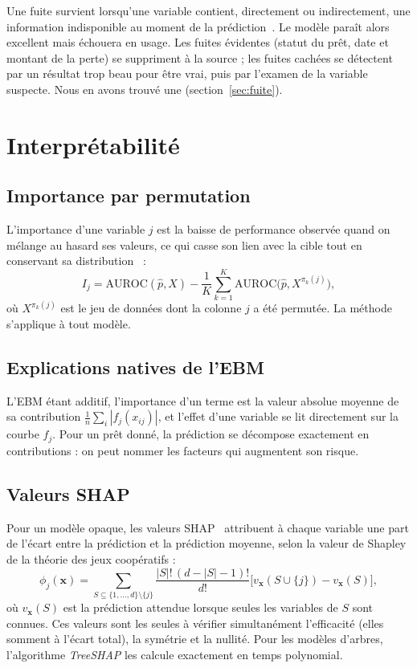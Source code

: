 Une fuite survient lorsqu'une variable contient, directement ou indirectement, une information indisponible au
moment de la prédiction~\cite{kaufman2012}. Le modèle paraît alors excellent mais échouera en usage. Les fuites
évidentes (statut du prêt, date et montant de la perte) se suppriment à la source ; les fuites cachées se détectent
par un résultat trop beau pour être vrai, puis par l'examen de la variable suspecte. Nous en avons trouvé une
(section~\ref{sec:fuite}).

\section{Interprétabilité}

\subsection{Importance par permutation}

L'importance d'une variable $j$ est la baisse de performance observée quand on mélange au hasard ses valeurs, ce qui
casse son lien avec la cible tout en conservant sa distribution~\cite{breiman2001,fisher2019} :
\begin{equation}
  I_j = \mathrm{AUROC}(\hat p, X) - \frac{1}{K}\sum_{k=1}^{K} \mathrm{AUROC}\big(\hat p, X^{\pi_k(j)}\big),
\end{equation}
où $X^{\pi_k(j)}$ est le jeu de données dont la colonne $j$ a été permutée. La méthode s'applique à tout modèle.

\subsection{Explications natives de l'EBM}

L'EBM étant additif, l'importance d'un terme est la valeur absolue moyenne de sa contribution
$\frac{1}{n}\sum_i |f_j(x_{ij})|$, et l'effet d'une variable se lit directement sur la courbe $f_j$. Pour un prêt
donné, la prédiction se décompose exactement en contributions : on peut nommer les facteurs qui augmentent son risque.

\subsection{Valeurs SHAP}

Pour un modèle opaque, les valeurs SHAP~\cite{lundberg2017} attribuent à chaque variable une part de l'écart entre la
prédiction et la prédiction moyenne, selon la valeur de Shapley de la théorie des jeux coopératifs :
\begin{equation}
  \phi_j(\bm{x}) = \sum_{S \subseteq \{1,\dots,d\}\setminus\{j\}}
  \frac{|S|!\,(d-|S|-1)!}{d!}\Big[ v_{\bm{x}}(S\cup\{j\}) - v_{\bm{x}}(S) \Big],
\end{equation}
où $v_{\bm{x}}(S)$ est la prédiction attendue lorsque seules les variables de $S$ sont connues. Ces valeurs sont les
seules à vérifier simultanément l'efficacité (elles somment à l'écart total), la symétrie et la nullité. Pour les
modèles d'arbres, l'algorithme \textit{TreeSHAP} les calcule exactement en temps polynomial.

